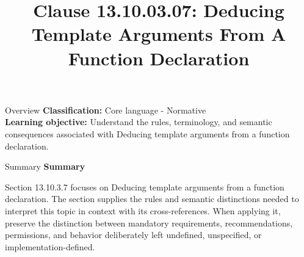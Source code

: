 \documentclass[10pt,letterpaper]{article}
\title{Clause 13.10.03.07: Deducing Template Arguments From A Function Declaration}
\author{}
\date{}
\begin{document}
\maketitle
\begin{CornellOverviewBox}{Overview}
\textbf{Classification:} Core language - Normative\\[2pt]
\textbf{Learning objective:} Understand the rules, terminology, and semantic consequences associated with Deducing template arguments from a function declaration.
\end{CornellOverviewBox}\begin{CornellSummaryBox}{Summary}
{\sffamily\bfseries\color{Accent} Summary}\par\vspace{3pt}Section 13.10.3.7 focuses on Deducing template arguments from a function declaration. The section supplies the rules and semantic distinctions needed to interpret this topic in context with its cross-references. When applying it, preserve the distinction between mandatory requirements, recommendations, permissions, and behavior deliberately left undefined, unspecified, or implementation-defined.
\end{CornellSummaryBox}
\end{document}
